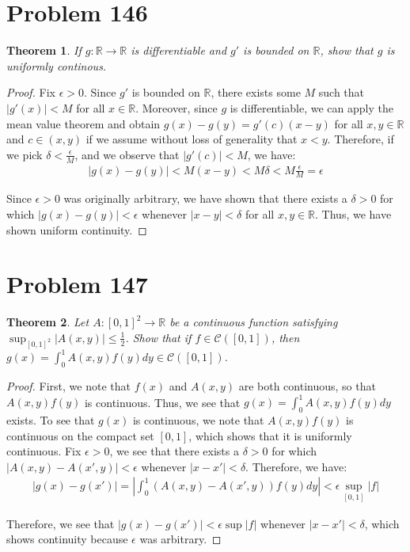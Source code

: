 \documentclass[psamsfonts]{amsart}
\newtheorem{thm}{Theorem}[section]
\theoremstyle{definition}
\theoremstyle{remark}
\numberwithin{equation}{section}
\begin{document}
\section{Problem 146}

\begin{thm}
If $g: \mathbb{R} \to \mathbb{R}$ is differentiable and $g'$ is bounded on $\mathbb{R}$, show that $g$ is uniformly continous.
\end{thm}

\begin{proof}
Fix $\epsilon > 0$. Since $g'$ is bounded on $\mathbb{R}$, there exists some $M$ such that $|g'(x)| < M$ for all $x \in \mathbb{R}$. Moreover, since $g$ is differentiable, we can apply the mean value theorem and obtain $ g(x) - g(y) = g'(c) (x-y)$ for all $x,y \in \mathbb{R}$ and $c \in (x,y)$ if we assume without loss of generality that $x < y$. Therefore, if we pick $\delta < \frac{\epsilon}{M}$, and we observe that $|g'(c)| < M$, we have:
\begin{eqnarray}
|g(x) - g(y)| < M (x-y) < M \delta < M \frac{ \epsilon}{M} = \epsilon
\end{eqnarray}

Since $\epsilon > 0$ was originally arbitrary, we have shown that there exists a $\delta > 0$ for which $|g(x) - g(y)| < \epsilon$ whenever $|x - y| < \delta$ for all $x,y \in \mathbb{R}$. Thus, we have shown uniform continuity.
\end{proof}

\section{Problem 147}

\begin{thm}
Let $A: [0,1]^2 \to \mathbb{R}$ be a continuous function satisfying $\sup_{[0,1]^2} |A(x,y)| \leq \frac{1}{2}$. Show that if $f \in \mathscr{C}([0,1])$, then $g(x) = \int_0^1 A(x,y) f(y) dy \in \mathscr{C}([0,1])$. 
\end{thm}

\begin{proof}
First, we note that $f(x)$ and $A(x,y)$ are both continuous, so that $A(x,y) f(y)$ is continuous. Thus, we see that $g(x) = \int_0^1 A(x,y) f(y) dy$ exists. To see that $g(x)$ is continuous, we note that $A(x,y) f(y)$ is continuous on the compact set $[0,1]$, which shows that it is uniformly continuous. Fix $\epsilon > 0$, we see that there exists a $\delta > 0$ for which $|A(x,y) - A(x',y)| < \epsilon$ whenever $|x - x'| < \delta$. Therefore, we have:
\begin{eqnarray}
|g(x) - g(x')| = \left| \int_0^1 (A(x,y) - A(x',y)) f(y) dy \right| < \epsilon \sup_{[0,1]} |f| 
\end{eqnarray}

Therefore, we see that $|g(x) - g(x')| < \epsilon \sup |f|$ whenever $|x - x'| < \delta$, which shows continuity because $\epsilon$ was arbitrary.
\end{proof}
\end{document}
